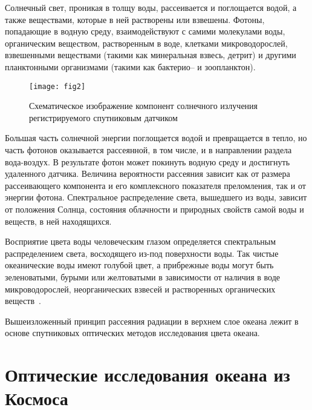 Солнечный свет, проникая в толщу воды, рассеивается и поглощается водой, а также веществами, которые в ней растворены или взвешены. Фотоны, попадающие в водную среду, взаимодействуют с самими молекулами воды, органическим веществом, растворенным в воде, клетками микроводорослей, взвешенными веществами (такими как минеральная взвесь, детрит) и другими планктонными организмами (такими как бактерио-- и зоопланктон).



\begin{figure}[!thb]
 \texttt{[image: fig2]}
 \caption{Схематическое изображение компонент солнечного излучения регистрируемого спутниковым датчиком}
 \label{fig:2} 
\end{figure}

Большая часть солнечной энергии поглощается водой и превращается в тепло, но часть фотонов оказывается рассеянной, в том числе, и в направлении раздела вода-воздух. В результате фотон может покинуть водную среду и достигнуть удаленного датчика. Величина вероятности рассеяния зависит как от размера рассеивающего компонента и его комплексного показателя преломления, так и от энергии фотона. Спектральное распределение света, вышедшего из воды, зависит от положения Солнца, состояния облачности и природных свойств самой воды и веществ, в ней находящихся.

Восприятие цвета воды человеческим глазом определяется спектральным распределением света, восходящего из-под поверхности воды. Так чистые океанические воды имеют голубой цвет, а прибрежные воды могут быть зеленоватыми, бурыми или желтоватыми в зависимости от наличия в воде микроводорослей, неорганических взвесей и растворенных органических веществ~\citep{Pozdnyakov2003}.

Вышеизложенный принцип рассеяния радиации в верхнем слое океана лежит в основе спутниковых оптических методов исследования цвета океана.



\newpage

\section{Оптические исследования океана из Космоса} \label{sec:1.2}


